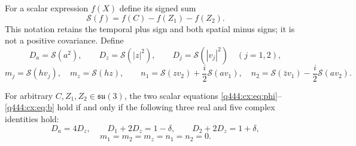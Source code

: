 For a scalar expression $f(X)$ define its signed sum
\[
\mathscr S(f)=f(C)-f(Z_1)-f(Z_2).
\]
This notation retains the temporal plus sign and both spatial minus
signs; it is not a positive covariance. Define
\[
D_a=\mathscr S(a^2),\qquad D_z=\mathscr S(|z|^2),\qquad
D_j=\mathscr S(|v_j|^2)\quad(j=1,2),
\]
\[
m_j=\mathscr S(hv_j),\quad m_z=\mathscr S(hz),\qquad
n_1=\mathscr S(zv_2)+\frac i2\mathscr S(av_1),\quad
n_2=\mathscr S(\bar z v_1)-\frac i2\mathscr S(av_2).
\]

\begin{proposition}
\label{q444:complex-full-scalar-equivalence}
For arbitrary $C,Z_1,Z_2\in\mathfrak{su}(3)$, the two scalar equations
\eqref{q444:cx:eq:phi}--\eqref{q444:cx:eq:b}
hold if and only if the following three real and five complex identities
hold:
\begin{equation}
D_a=4D_z,\qquad
D_1+2D_z=1-\delta,\qquad D_2+2D_z=1+\delta,
\label{q444:complex-scalar-diagonal-identities}
\end{equation}
\begin{equation}
m_1=m_2=m_z=n_1=n_2=0.
\label{q444:complex-scalar-cross-identities}
\end{equation}
\end{proposition}
